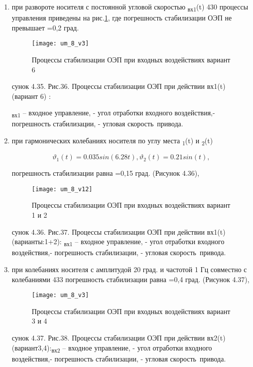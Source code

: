 \begin{enumerate}
	\item при развороте носителя с постоянной угловой скоростью \textsubscript{вх1}(t) 430 процессы управления приведены на рис.\ref{fig:um35}, где погрешность стабилизации ОЭП не превышает  =0,2 град\textit{. }
	
	\begin{figure}[ht]
		\centering
		\texttt{[image: um\_8\_v3]} 
		\caption{Процессы стабилизации ОЭП при входных воздействиях  вариант 6}
		\label{fig:um35}
	\end{figure}
	сунок 4.35. Рис.36. Процессы стабилизации ОЭП при действии вх1(t) (вариант 6) :
	
	\textsubscript{вх1} – входное управление,  - угол отработки входного воздействия,- погрешность стабилизации,  - угловая скорость\  привода.
	
	\item при гармонических колебаниях носителя по углу места \textsubscript{1}(t) и \textsubscript{2}(t) 
	
	\begin{equation}
	\label{eq:p4:433}
	\vartheta_{1}(t)=0.035sin(6.28t),\vartheta_{2}(t)=0.21sin(t),
	\end{equation}
	
	погрешность стабилизации равна  =0,15 град. (Рисунок 4.36),
	
	\begin{figure}[ht]
		\centering
		\texttt{[image: um\_8\_v12]} 
		\caption{Процессы стабилизации ОЭП при входных воздействиях  вариант 1 и 2}
		\label{fig:um36}
	\end{figure}
	сунок 4.36. Рис.37. Процессы стабилизации ОЭП при действии вх1(t) (варианты:1+2):
	\textsubscript{вх1} – входное управление,  - угол отработки входного воздействия,- погрешность стабилизации,  - угловая скорость\  привода.
	
	\item при колебаниях носителя с амплитудой 20 град. и частотой 1 Гц  совместно с колебаниями 433 погрешность стабилизации равна  =0,4 град. (Рисунок 4.37),
	
	\begin{figure}[ht]
		\centering
		\texttt{[image: um\_8\_v3]} 
		\caption{Процессы стабилизации ОЭП при входных воздействиях  вариант 3 и 4}
		\label{fig:um37}
	\end{figure}
	сунок 4.37. Рис.38. Процессы стабилизации ОЭП при действии вх2(t) (вариант3,4):\textsubscript{вх2} – входное управление,  - угол отработки входного воздействия,- погрешность стабилизации,  - угловая скорость\  привода.
	

\end{enumerate}
